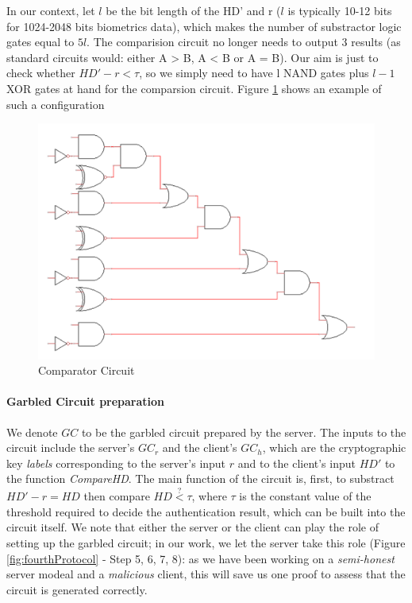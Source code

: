 In our context, let \(l\) be the bit length of the HD' and r (\(l\) is typically
10-12 bits for 1024-2048 bits biometrics data), which makes the number of
substractor logic gates equal to \(5l\). The comparision circuit no longer needs
to output 3 results (as standard circuits would: either A > B, A < B or A =
B). Our aim is just to check whether \(HD' - r < \tau\), so we simply need to
have l NAND gates plus \(l-1\) XOR gates at hand for the comparsion
circuit. Figure \ref{fig:comparisionCircuit1} shows an example of such a
configuration
\begin{figure}[htbp!] 
  \centering    
  \includegraphics[scale=0.75]{Chapter7/Figs/Raster/comparisionCircuit}
  \caption{Comparator Circuit}
  \label{fig:comparisionCircuit1}
\end{figure}

\paragraph{Garbled Circuit preparation}
We denote \(GC\) to be the garbled circuit prepared by the server. The inputs to
the circuit include the server's \(GC_{r}\) and the client's \(GC_{h}\), which
are the cryptographic key \textit{labels} corresponding to the server's input
\(r\) and to the client's input \(HD'\) to the function \textit{CompareHD}. The main
function of the circuit is, first, to substract \(HD' - r = HD\) then compare
\(HD \stackrel{?}{<} \tau\), where \(\tau\) is the constant value of the
threshold required to decide the authentication result, which can be built into the
circuit itself. We note that either the server or the client can play the role of
setting up the garbled circuit; in our work, we let the server take this role
(Figure \ref{fig:fourthProtocol} - Step 5, 6, 7, 8): as we have
been working on a \textit{semi-honest} server modeal and a \textit{malicious }
client, this will save us one proof to assess that the circuit is generated
correctly.

